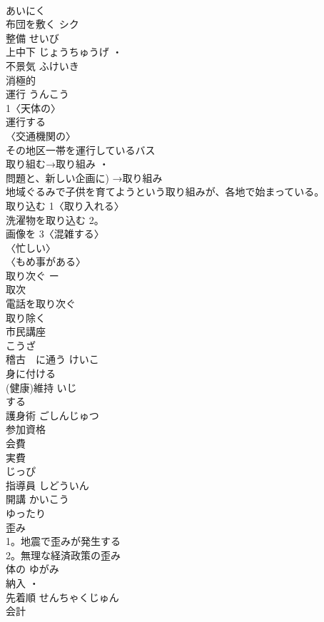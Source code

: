 \documentclass[8pt]{extreport}
\begin{document}
\begin{CJK}{UTF8}{min}
\\	あいにく	
\\	布団を敷く	シク 
\\	整備	せいび 
\\	上中下	じょうちゅうげ ・
\\	不景気	ふけいき 
\\	消極的	
\\	運行	うんこう 
\\	1〈天体の〉 
\\	運行する 
\\	〈交通機関の〉 
\\	その地区一帯を運行しているバス 
\\	取り組む→取り組み	・
\\	問題と、新しい企画に) →取り組み 
\\	地域ぐるみで子供を育てようという取り組みが、各地で始まっている。
\\	取り込む	1〈取り入れる〉 
\\	洗濯物を取り込む 2。
\\	画像を 3〈混雑する〉 
\\	〈忙しい〉 
\\	〈もめ事がある〉 
\\	取り次ぐ ー
\\	取次	
\\	電話を取り次ぐ 
\\	取り除く	
\\	市民講座	
\\	こうざ
\\	稽古　に通う	けいこ 
\\	身に付ける	
\\	(健康)維持	いじ 
\\	する　
\\	護身術	ごしんじゅつ 
\\	参加資格	
\\	会費	
\\	実費	
\\	じっぴ
\\	指導員	しどういん 
\\	開講	かいこう 
\\	ゆったり	
\\	歪み	
\\	1。地震で歪みが発生する 
\\	2。無理な経済政策の歪み 
\\	体の ゆがみ
\\	納入	・
\\	先着順	せんちゃくじゅん 
\\	会計	

\end{CJK}
\end{document}
